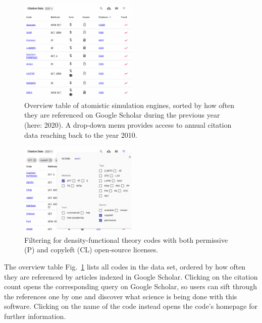 \documentclass[9pt,review]{livecoms}
\begin{document}
\begin{figure}
    \includegraphics[width=0.5\textwidth]{figures/overview}
    \caption{
        Overview table of atomistic simulation engines, sorted by how often they are referenced on Google Scholar during the previous year (here: 2020).
        A drop-down menu provides access to annual citation data reaching back to the year 2010.
    }
    \label{fig:overview}



\end{figure}
\begin{figure}
    \includegraphics[width=0.5\textwidth]{figures/overview-filter}
    \caption{
        Filtering for density-functional theory codes with both permissive (P) and copyleft (CL) open-source licenses.
    }
    \label{fig:overview-filter}
\end{figure}

The overview table Fig.~\ref{fig:overview} lists all codes in the data set, ordered by how often they are referenced by articles indexed in Google Scholar. 
Clicking on the citation count opens the corresponding query on Google Scholar, so users can sift through the references one by one and discover what science is being done with this software.
Clicking on the name of the code instead opens the code's homepage for further information.
\end{document}
